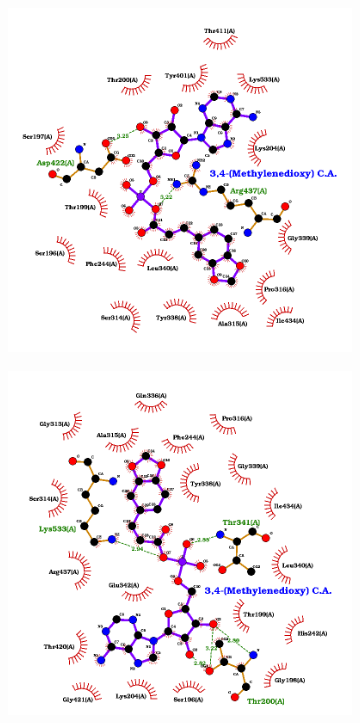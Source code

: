 \documentclass[12pt]{article}
\begin{document}
	\vspace{-10pt}
	\FloatBarrier
	\begin{figure}[h]
		\centering
		\begin{subfigure}[h!]{0.35\textwidth}
			\hspace{2cm}
			\includegraphics[width=\textwidth]{../6/propose/Dock/best.png}
			\caption{}
		\end{subfigure}
		\hfill
		\begin{subfigure}[h!]{0.35\textwidth}
			\hspace{-2cm}
			\includegraphics[width=\textwidth]{../6/propose/Dock/best2.png}

\end{subfigure}
\end{figure}
\end{document}

